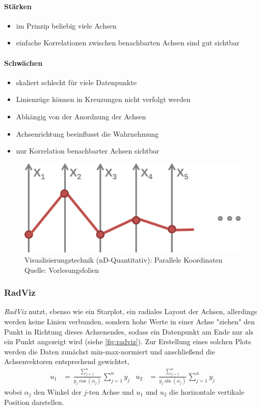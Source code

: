 				\paragraph{Stärken}
				\begin{itemize}
					\item im Prinzip beliebig viele Achsen
					\item einfache Korrelationen zwischen benachbarten Achsen sind gut sichtbar
				\end{itemize}

				\paragraph{Schwächen}
				\begin{itemize}
					\item skaliert schlecht für viele Datenpunkte
					\item Linienzüge können in Kreuzungen nicht verfolgt werden
					\item Abhängig von der Anordnung der Achsen
					\item Achsenrichtung beeinflusst die Wahrnehmung
					\item nur Korrelation benachbarter Achsen sichtbar
				\end{itemize}

				\begin{figure}
					\centering
					\includegraphics[width=0.5\linewidth]{parallelekoordinaten}
					\caption[Visualisierungstechnik (nD-Quantitativ): Parallele Koordinaten]{Visualisierungstechnik (nD-Quantitativ): Parallele Koordinaten\\Quelle: Vorlesungsfolien}
					\label{fig:parallelekoordinaten}
				\end{figure}

			\subsubsection{RadViz}
				\emph{RadViz} nutzt, ebenso wie ein Starplot, ein radiales Layout der Achsen, allerdings werden keine Linien verbunden, sondern hohe Werte in einer Achse "ziehen" den Punkt in Richtung dieses Achsenendes, sodass ein Datenpunkt am Ende nur als ein Punkt angezeigt wird (siehe \autoref{fig:radviz}). Zur Erstellung eines solchen Plots werden die Daten zunächst min-max-normiert und anschließend die Achsenvektoren entsprechend gewichtet, \dh
				\begin{align}
					u_1 &= \frac{\sum_{j = 1}^{n}}{y_j \cos(\alpha_j)}{\sum_{j = 1}^{n} y_j} &
					u_2 &= \frac{\sum_{j = 1}^{n}}{y_j \sin(\alpha_j)}{\sum_{j = 1}^{n} y_j}
				\end{align}
				wobei \(\alpha_j\) den Winkel der \(j\)-ten Achse und \(u_1\) und \(u_2\) die horizontale \bzw vertikale Position darstellen.


